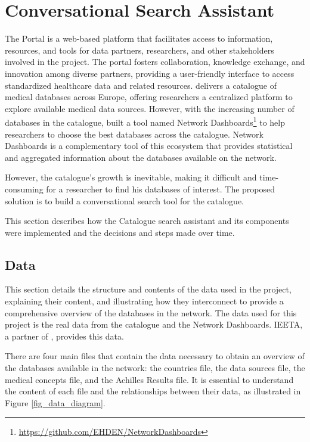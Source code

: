 \chapter{Conversational Search Assistant}
\label{chapter:ConversationalSearchAssistant}


The {\ehden} Portal is a web-based platform that facilitates access to information, resources, and tools for data partners, researchers, and other stakeholders involved in the {\ehden} project. The portal fosters collaboration, knowledge exchange, and innovation among diverse partners, providing a user-friendly interface to access standardized healthcare data and related resources. {\ehden} delivers a catalogue of medical databases across Europe, offering researchers a centralized platform to explore available medical data sources. However, with the increasing number of databases in the catalogue, {\ehden} built a tool named Network Dashboards\footnote{\url{https://github.com/EHDEN/NetworkDashboards}} to help researchers to choose the best databases across the catalogue. {\ehden} Network Dashboards is a complementary tool of this ecosystem that provides statistical and aggregated information about the databases available on the network. 

However, the catalogue's growth is inevitable, making it difficult and time-consuming for a researcher to find his databases of interest. The proposed solution is to build a conversational search tool for the {\ehden} catalogue.

This section describes how the {\ehden} Catalogue search assistant and its components were implemented and the decisions and steps made over time.

\section{Data}
\label{data}

This section details the structure and contents of the data used in the project, explaining their content, and illustrating how they interconnect to provide a comprehensive overview of the databases in the {\ehden} network. The data used for this project is the real {\ehden} data from the catalogue and the Network Dashboards. IEETA, a partner of {\ehden}, provides this data.

There are four main files that contain the data necessary to obtain an overview of the databases available in the {\ehden} network: the countries file, the data sources file, the medical concepts file, and the Achilles Results file. It is essential to understand the content of each file and the relationships between their data, as illustrated in Figure \ref{fig_data_diagram}.

